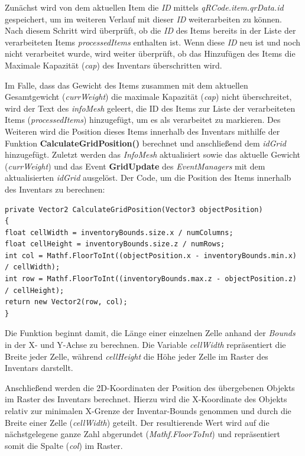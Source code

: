 Zunächst wird von dem aktuellen Item die \textit{ID} mittels \textit{qRCode.item.qrData.id} gespeichert, um im weiteren
Verlauf mit dieser \textit{ID} weiterarbeiten zu können. Nach diesem Schritt wird überprüft, ob die \textit{ID} des Items
bereits in der Liste der verarbeiteten Items \textit{processedItems} enthalten ist. Wenn diese \textit{ID} neu ist und
noch nicht verarbeitet wurde, wird weiter überprüft, ob das Hinzufügen des Items die Maximale Kapazität (\textit{cap})
des Inventars überschritten wird.

Im Falle, dass das Gewicht des Items zusammen mit dem aktuellen Gesamtgewicht (\textit{currWeight}) die maximale Kapazität
(\textit{cap}) nicht überschreitet, wird der Text des \textit{infoMesh} geleert, die ID des Items zur Liste der
verarbeiteten Items (\textit{processedItems}) hinzugefügt, um es als verarbeitet zu markieren. Des Weiteren wird die Position
dieses Items innerhalb des Inventars mithilfe der Funktion \textbf{CalculateGridPosition()} berechnet und anschließend dem
\textit{idGrid} hinzugefügt. Zuletzt werden das \textit{InfoMesh} aktualisiert sowie das aktuelle Gewicht (\textit{currWeight})
und das Event \textbf{GridUpdate} des \textit{EventManagers} mit dem aktualisierten \textit{idGrid} ausgelöst. Der Code,
um die Position des Items innerhalb des Inventars zu berechnen:
\begin{lstlisting}[caption={Position des Items berechnen}, label=code:controller_calcPos, language={[Sharp]C}]
private Vector2 CalculateGridPosition(Vector3 objectPosition)
{
float cellWidth = inventoryBounds.size.x / numColumns;
float cellHeight = inventoryBounds.size.z / numRows;
int col = Mathf.FloorToInt((objectPosition.x - inventoryBounds.min.x) / cellWidth);
int row = Mathf.FloorToInt((inventoryBounds.max.z - objectPosition.z) / cellHeight);
return new Vector2(row, col);
}
\end{lstlisting}
Die Funktion beginnt damit, die Länge einer einzelnen Zelle anhand der \textit{Bounds} in der X- und Y-Achse zu berechnen.
Die Variable \textit{cellWidth} repräsentiert die Breite jeder Zelle, während \textit{cellHeight} die Höhe jeder Zelle
im Raster des Inventars darstellt.

Anschließend werden die 2D-Koordinaten der Position des übergebenen Objekts im Raster des Inventars berechnet. Hierzu
wird die X-Koordinate des Objekts relativ zur minimalen X-Grenze der Inventar-Bounds genommen und durch die Breite einer
Zelle (\textit{cellWidth}) geteilt. Der resultierende Wert wird auf die nächstgelegene ganze Zahl abgerundet
(\textit{Mathf.FloorToInt}) und repräsentiert somit die Spalte (\textit{col}) im Raster.

